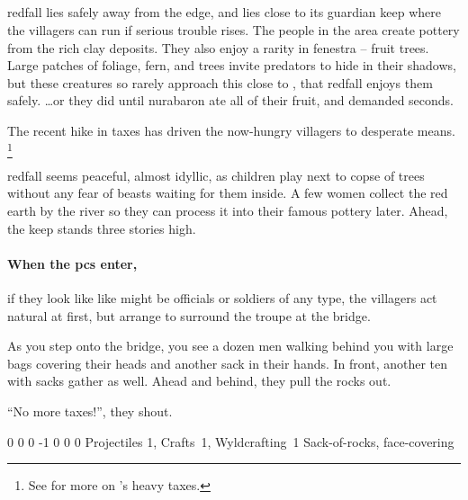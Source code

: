 
\subsection{}
\label{redfallVillage}

\Gls{redfall} lies safely away from the \gls{edge}, and lies close to its guardian keep where the villagers can run if serious trouble rises.
The people in the area create pottery from the rich clay deposits.
They also enjoy a rarity in \gls{fenestra} -- fruit trees.
Large patches of foliage, fern, and trees invite predators to hide in their shadows, but these creatures so rarely approach this close to , that \gls{redfall} enjoys them safely.
\ldots or they did until \gls{nurabaron} ate all of their fruit, and demanded seconds.

The recent hike in taxes has driven the now-hungry villagers to desperate means.%
\footnote{See  for more on 's heavy taxes.}

\begin{boxtext}
  \Gls{redfall} seems peaceful, almost idyllic, as children play next to copse of trees without any fear of beasts waiting for them inside.
  A few women collect the red earth by the river so they can process it into their famous pottery later.
  Ahead, the keep stands three stories high.
\end{boxtext}

\paragraph{When the \glspl{pc} enter,}
if they look like like might be officials or soldiers of any type, the villagers act natural at first, but arrange to surround the troupe at the bridge.

\begin{boxtext}

  As you step onto the bridge, you see a dozen men walking behind you with large bags covering their heads and another sack in their hands.
  In front, another ten with sacks gather as well.
  Ahead and behind, they pull the rocks out.

  ``No more taxes!'', they shout.

\end{boxtext}

{0}%
{0}%
{{0}%
{-1}%
{0}}%
{0}%
{0}%
{Projectiles 1, Crafts~1, Wyldcrafting~1}%
{Sack-of-rocks, face-covering}%
{}


